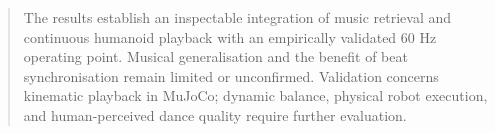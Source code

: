 \documentclass[12pt]{report}
\begin{document}
\begin{abstract}
The results establish an inspectable integration of music retrieval and
continuous humanoid playback with an empirically validated 60 Hz operating
point. Musical generalisation and the benefit of beat synchronisation remain
limited or unconfirmed. Validation concerns kinematic playback in MuJoCo;
dynamic balance, physical robot execution, and human-perceived dance quality
require further evaluation.

\end{abstract}
\tableofcontents

\clearpage
\hypersetup{pageanchor=true}
\setcounter{page}{1}













   





\appendix



\end{document}
